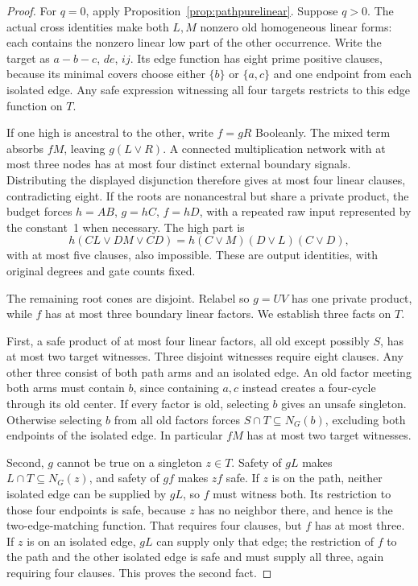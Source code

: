 \documentclass[11pt]{article}
\theoremstyle{definition}
\theoremstyle{remark}
\begin{document}
\begin{proof}
For $q=0$, apply Proposition~\ref{prop:pathpurelinear}. Suppose $q>0$. The actual cross identities make both $L,M$ nonzero old homogeneous linear forms: each contains the nonzero linear low part of the other occurrence. Write the target as $a-b-c$, $de$, $ij$. Its edge function has eight prime positive clauses, because its minimal covers choose either $\{b\}$ or $\{a,c\}$ and one endpoint from each isolated edge. Any safe expression witnessing all four targets restricts to this edge function on $T$.

If one high is ancestral to the other, write $f=gR$ Booleanly. The mixed term absorbs $fM$, leaving $g(L\vee R)$. A connected multiplication network with at most three nodes has at most four distinct external boundary signals. Distributing the displayed disjunction therefore gives at most four linear clauses, contradicting eight. If the roots are nonancestral but share a private product, the budget forces $h=AB$, $g=hC$, $f=hD$, with a repeated raw input represented by the constant~1 when necessary. The high part is
\[
 h(CL\vee DM\vee CD)=h(C\vee M)(D\vee L)(C\vee D),
\]
with at most five clauses, also impossible. These are output identities, with original degrees and gate counts fixed.

The remaining root cones are disjoint. Relabel so $g=UV$ has one private product, while $f$ has at most three boundary linear factors. We establish three facts on $T$.

First, a safe product of at most four linear factors, all old except possibly $S$, has at most two target witnesses. Three disjoint witnesses require eight clauses. Any other three consist of both path arms and an isolated edge. An old factor meeting both arms must contain $b$, since containing $a,c$ instead creates a four-cycle through its old center. If every factor is old, selecting $b$ gives an unsafe singleton. Otherwise selecting $b$ from all old factors forces $S\cap T\subseteq N_G(b)$, excluding both endpoints of the isolated edge. In particular $fM$ has at most two target witnesses.

Second, $g$ cannot be true on a singleton $z\in T$. Safety of $gL$ makes $L\cap T\subseteq N_G(z)$, and safety of $gf$ makes $zf$ safe. If $z$ is on the path, neither isolated edge can be supplied by $gL$, so $f$ must witness both. Its restriction to those four endpoints is safe, because $z$ has no neighbor there, and hence is the two-edge-matching function. That requires four clauses, but $f$ has at most three. If $z$ is on an isolated edge, $gL$ can supply only that edge; the restriction of $f$ to the path and the other isolated edge is safe and must supply all three, again requiring four clauses. This proves the second fact.


\end{proof}
\end{document}
